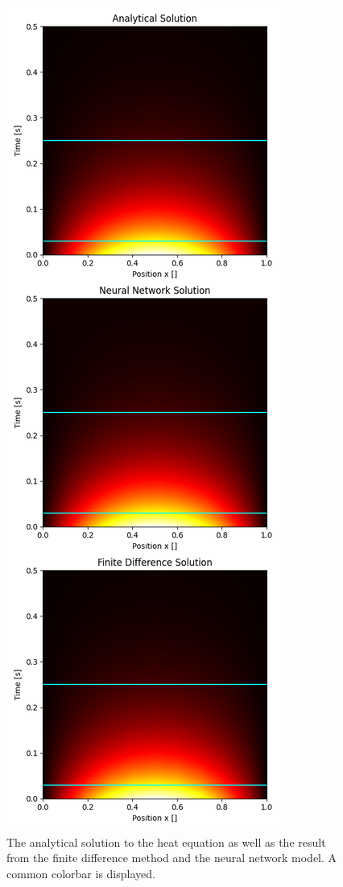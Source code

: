 


\begin{figure}[h!]
    \centering
    \includegraphics[width=1.0\linewidth]{project_3/plots/heat_map_comparison.png}
    \caption{The analytical solution to the heat equation as well as the result from the finite difference method and the neural network model. A common colorbar is displayed. 
    }
    \label{fig:heatmaps}
\end{figure}

